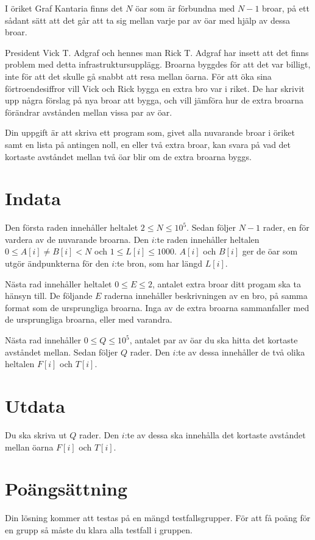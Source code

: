 I öriket Graf Kantaria finns det $N$ öar som är förbundna med $N - 1$ broar, på ett sådant sätt att det går att ta sig mellan varje par av öar med hjälp av dessa broar.

President Vick T. Adgraf och hennes man Rick T. Adgraf har insett att det finns problem med detta infrastrukturs\-upplägg.
Broarna byggdes för att det var billigt, inte för att det skulle gå snabbt att resa mellan öarna.
För att öka sina förtroendesiffror vill Vick och Rick bygga en extra bro var i riket.
De har skrivit upp några förslag på nya broar att bygga, och vill jämföra hur de extra broarna förändrar avstånden mellan vissa par av öar.

Din uppgift är att skriva ett program som, givet alla nuvarande broar i öriket samt en lista på antingen noll, en eller två extra broar, kan svara på vad det kortaste avståndet mellan två öar blir om de extra broarna byggs.

\section*{Indata}
Den första raden innehåller heltalet $2 \le N \le 10^5$.
Sedan följer $N - 1$ rader, en för vardera av de nuvarande broarna.
Den $i$:te raden innehåller heltalen $0 \le A[i] \not= B[i] < N$ och $1 \le L[i] \le 1000$.
$A[i]$ och $B[i]$ ger de öar som utgör ändpunkterna för den $i$:te bron, som har längd $L[i]$.

Nästa rad innehåller heltalet $0 \le E \le 2$, antalet extra broar ditt progam ska ta hänsyn till.
De följande $E$ raderna innehåller beskrivningen av en bro, på samma format som de ursprungliga broarna.
Inga av de extra broarna sammanfaller med de ursprungliga broarna, eller med varandra.

Nästa rad innehåller $0 \le Q \le 10^5$, antalet par av öar du ska hitta det kortaste avståndet mellan.
Sedan följer $Q$ rader.
Den $i$:te av dessa innehåller de två olika heltalen $F[i]$ och $T[i]$.

\section*{Utdata}
Du ska skriva ut $Q$ rader.
Den $i$:te av dessa ska innehålla det kortaste avståndet mellan öarna $F[i]$ och $T[i]$.

\section*{Poängsättning}
Din lösning kommer att testas på en mängd testfallsgrupper. För att få poäng för en grupp
så måste du klara alla testfall i gruppen.

